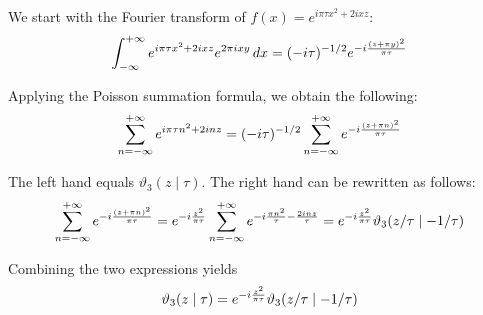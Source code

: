 \documentclass[12pt]{article}
\begin{document}
We start with the Fourier transform of $f(x) = e^{i \pi \tau x^2 + 2 i x z}$:
 $$\int_{-\infty}^{+\infty} e^{i \pi \tau x^2 + 2 i x z} e^{2 \pi ixy} \, dx = (- i \tau)^{-1/2} e^{-i {(z + \pi y)^2 \over \pi \tau}}$$

Applying the Poisson summation formula, we obtain the following:
 $$\sum_{n=-\infty}^{+\infty} e^{i \pi \tau n^2 + 2 i n z} = (- i \tau)^{-1/2} \sum_{n=-\infty}^{+\infty} e^{-i {(z + \pi n)^2 \over \pi \tau}}$$

The left hand  equals $\vartheta_3 (z \mid \tau)$.  The right hand  can be rewritten as follows:
 $$\sum_{n=-\infty}^{+\infty} e^{-i {(z + \pi n)^2 \over \pi \tau}} = e^{-i {z^2 \over \pi \tau}} \sum_{n=-\infty}^{+\infty} e^{-i {\pi n^2 \over \tau} - {2 i n z \over \tau}} = e^{-i {z^2 \over \pi \tau}} \vartheta_3 (z / \tau  \mid -1 / \tau)$$

Combining the two expressions yields
 $$\vartheta_3 (z \mid \tau) = e^{-i {z^2 \over \pi \tau}} \vartheta_3 (z / \tau  \mid -1 / \tau)$$
\end{document}
